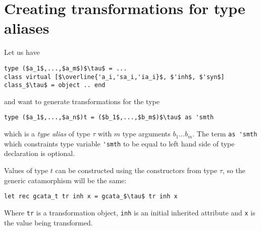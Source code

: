 \documentclass[acmsmall,review,anonymous]{acmart}\settopmatter{printfolios=true,printccs=false,printacmref=false}
\begin{document}
\section{Creating transformations for type aliases}
Let us have
\begin{lstlisting}
type ($a_1$,...,$a_m$)$\tau$ = ...
class virtual [$\overline{'a_i,'sa_i,'ia_i}$, $'inh$, $'syn$] class_$\tau$ = object .. end
\end{lstlisting}
and want to generate transformations for the type
\begin{lstlisting}
type ($a_1$,...,$a_n$)t = ($b_1$,...,$b_m$)$\tau$ as 'smth
\end{lstlisting}
which is a \textit{type alias} of type $\tau$ with $m$ type arguments $b_1$...$b_m$. The term \lstinline{as 'smth} which constraints type variable \lstinline{'smth} to be equal to left hand side of type declaration is optional.

Values of type $t$ can be constructed using the constructors from type $\tau$, so the generic catamorphism will be the same:
\begin{lstlisting}
let rec gcata_t tr inh x = gcata_$\tau$ tr inh x
\end{lstlisting}
Where \lstinline{tr} is a transformation object, \lstinline{inh} is an initial inherited attribute and \lstinline{x} is the value being transformed.
\end{document}
